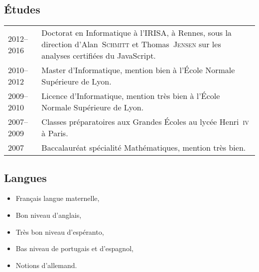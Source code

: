 \documentclass[12pt,a4paper]{article}
\makeatletter
\newenvironment{datecvsection}[1]%
               {\subsection*{#1}%
                 \noindent \begin{tabular}{@{}p{\annee}p{\texte}@{}}}
               {\end{tabular}}
\newenvironment{itemcvsection}[1]%
               {\subsection*{#1}\begin{itemize}}
               {\end{itemize}}
\newcommand\familyName{\textsc}
\newcommand\placeName{}
\makeatother
\begin{document}
\begin{datecvsection}{Études}

    2012–2016 & Doctorat en Informatique à l’\placeName{IRISA}, à \placeName{Rennes}, sous la direction d’Alan~\familyName{Schmitt} et Thomas~\familyName{Jensen} sur les analyses certifiées du JavaScript. \\

	2010–2012 & Master d’Informatique, mention bien à l’École Normale Supérieure de \placeName{Lyon}. \\

	2009–2010 & Licence d’Informatique, mention très bien à l’École Normale Supérieure de \placeName{Lyon}. \\

    2007–2009 & Classes préparatoires aux Grandes Écoles au lycée \placeName{Henri~\textsc{iv}} à \placeName{Paris}. \\

	2007 & Baccalauréat spécialité Mathématiques, mention très bien. \\

\end{datecvsection}

\begin{itemcvsection}{Langues}

   \item Français langue maternelle,
   \item Bon niveau d’anglais,
   \item Très bon niveau d’espéranto,
   \item Bas niveau de portugais et d’espagnol,
   \item Notions d’allemand.

\end{itemcvsection}
\end{document}
